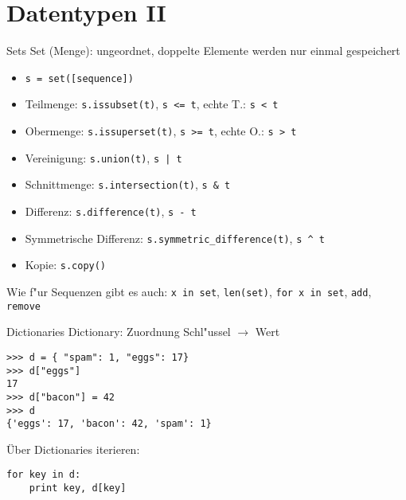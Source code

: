 \section{Datentypen II}

\begin{frame}[fragile]{Sets}
\alert{Set} (Menge): ungeordnet, doppelte Elemente werden nur einmal gespeichert
\begin{itemize}
\item \lstinline{s = set([sequence])}
\item \alert{Teilmenge}: \lstinline{s.issubset(t)}, \lstinline{s <= t}, echte T.: \lstinline{s < t}
\item \alert{Obermenge}: \lstinline{s.issuperset(t)}, \lstinline{s >= t}, echte O.: \lstinline{s > t} 
\item \alert{Vereinigung}: \lstinline{s.union(t)}, \lstinline{s | t}
\item \alert{Schnittmenge}: \lstinline{s.intersection(t)}, \lstinline{s & t}
\item \alert{Differenz}: \lstinline{s.difference(t)}, \lstinline{s - t}
\item Symmetrische Differenz: \lstinline{s.symmetric_difference(t)}, \lstinline{s ^ t}
\item Kopie: \lstinline{s.copy()}
\end{itemize}
Wie f"ur Sequenzen gibt es auch: \lstinline{x in set}, \lstinline{len(set)}, \lstinline{for x in set}, \lstinline{add}, \lstinline{remove}
\end{frame}

\begin{frame}[fragile]{Dictionaries}
\alert{Dictionary}: Zuordnung Schl"ussel $\rightarrow$ Wert
\begin{lstlisting}[style=Shell]
>>> d = { "spam": 1, "eggs": 17}
>>> d["eggs"]
17
>>> d["bacon"] = 42
>>> d
{'eggs': 17, 'bacon': 42, 'spam': 1}
\end{lstlisting}
\"Uber Dictionaries iterieren:
\begin{lstlisting}[style=Python]
for key in d:
    print key, d[key]
\end{lstlisting}
\end{frame}

